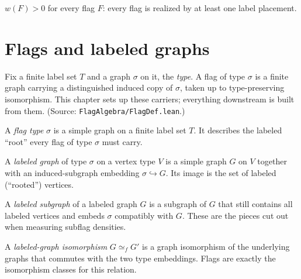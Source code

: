 \begin{theorem}
  \label{lem:downward-factor-pos}
  \leanok
  $w(F) > 0$ for every flag $F$: every flag is realized by at least one label
  placement.
\end{theorem}


\chapter{Flags and labeled graphs}
\label{chap:flags}

Fix a finite label set $T$ and a graph $\sigma$ on it, the \emph{type}. A flag of
type $\sigma$ is a finite graph carrying a distinguished induced copy of $\sigma$,
taken up to type-preserving isomorphism. This chapter sets up these carriers;
everything downstream is built from them. (Source: \texttt{FlagAlgebra/FlagDef.lean}.)

\begin{definition}
  \label{def:flag-type}
  \leanok
  A \emph{flag type} $\sigma$ is a simple graph on a finite label set $T$. It
  describes the labeled ``root'' every flag of type $\sigma$ must carry.
\end{definition}

\begin{definition}
  \label{def:labeled-graph}
  \leanok
  A \emph{labeled graph} of type $\sigma$ on a vertex type $V$ is a simple graph
  $G$ on $V$ together with an induced-subgraph embedding
  $\sigma \hookrightarrow G$. Its image is the set of labeled (``rooted'')
  vertices.
\end{definition}

\begin{definition}
  \label{def:labeled-subgraph}
  \leanok
  A \emph{labeled subgraph} of a labeled graph $G$ is a subgraph of $G$ that
  still contains all labeled vertices and embeds $\sigma$ compatibly with $G$.
  These are the pieces cut out when measuring subflag densities.
\end{definition}

\begin{definition}
  \label{def:labeled-graph-iso}
  \leanok
  A \emph{labeled-graph isomorphism} $G \simeq_f G'$ is a graph isomorphism of the
  underlying graphs that commutes with the two type embeddings. Flags are exactly
  the isomorphism classes for this relation.
\end{definition}

